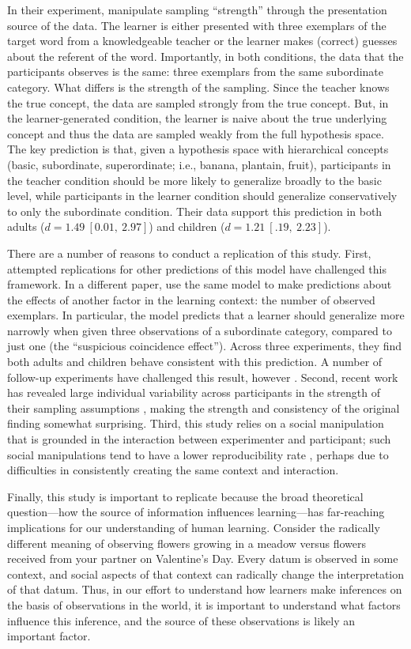 \documentclass[man]{apa2}
\begin{document}
In their experiment,  manipulate sampling ``strength'' through the presentation source of the data. The learner is either presented with three exemplars of the target word from a knowledgeable teacher or the learner makes (correct) guesses about the referent of the word. Importantly, in both conditions, the data that the participants observes is the same: three exemplars from the same subordinate category. What differs is the strength of the sampling. Since the teacher knows the true concept, the data are sampled strongly from the true concept. But, in the learner-generated condition, the learner is naive about the true underlying concept and thus the data are sampled weakly from the full hypothesis space. The key prediction is that, given a hypothesis space with hierarchical concepts (basic, subordinate, superordinate; i.e., banana, plantain, fruit), participants in the teacher condition should be more likely to generalize broadly to the basic level, while participants in the learner condition should generalize conservatively to only the subordinate condition. Their data support  this prediction in both adults ($d = 1.49\ [0.01,\ 2.97]$) and children ($d = 1.21\ [.19,\ 2.23]$).

There are a number of reasons to conduct a replication of this study. First, attempted replications for other predictions of this model have challenged this framework. In a different paper,  use the same model to make predictions about the effects of another factor in the learning context: the number of observed exemplars. In particular, the model predicts that a learner should generalize more narrowly when given three observations of a subordinate category, compared to just one (the ``suspicious coincidence effect''). Across three experiments, they find both adults and children behave consistent with this prediction. A number of follow-up experiments have challenged this result, however \cite{jenkins2015non,spencer2011}. Second, recent work has revealed large individual variability across participants in the strength of their sampling assumptions \cite{navarro2012sampling}, making the strength and consistency of the original finding somewhat surprising. Third, this study relies on a social manipulation that is grounded in the interaction between experimenter and participant; such social manipulations tend to have a lower reproducibility rate \cite{reproProj2015}, perhaps due to difficulties in consistently creating the same context and interaction.

Finally, this study is important to replicate because the broad theoretical question---how the source of information influences learning---has far-reaching implications for our understanding of human learning. Consider the radically different meaning of observing flowers growing in a meadow versus flowers received from your partner on Valentine's Day. Every datum is observed in some context, and social aspects of that context can radically change the interpretation of that datum. Thus, in our effort to understand how learners make inferences on the basis of observations in the world, it is important to understand what factors influence this inference, and the source of these observations is likely an important factor.
\end{document}
